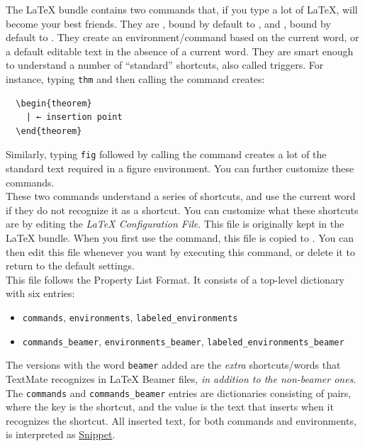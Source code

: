 \documentclass[11pt, x11names]{article}
\begin{document}
The LaTeX bundle contains two commands that, if you type a lot of LaTeX, will become your best friends. They are , bound by default to \keys{\cmd + \textless{}}, and , bound by default to \keys{\cmd + \textgreater{}}. They create an environment/command based on the current word, or a default editable text in the absence of a current word. They are smart enough to understand a number of “standard” shortcuts, also called triggers. For instance, typing \texttt{thm} and then calling the  command creates:

\begin{verbatim}
  \begin{theorem}
    | ← insertion point
  \end{theorem}
\end{verbatim}

Similarly, typing \texttt{fig} followed by calling the  command creates a lot of the standard text required in a figure environment. You can further customize these commands.\\

These two commands understand a series of shortcuts, and use the current word if they do not recognize it as a shortcut. You can customize what these shortcuts are by editing the \emph{LaTeX Configuration File}. This file is originally kept in the LaTeX bundle. When you first use the  command, this file is copied to . You can then edit this file whenever you want by executing this command, or delete it to return to the default settings.\\

This file follows the Property List Format. It consists of a top-level dictionary
with six entries:

\begin{itemize}
  \item \texttt{commands}, \texttt{environments}, \texttt{labeled\_environments}
  \item \texttt{commands\_beamer}, \texttt{environments\_beamer}, \texttt{labeled\_environments\_beamer}
\end{itemize}

\begin{sloppypar}
The versions with the word \texttt{beamer} added are the \emph{extra} shortcuts/words that TextMate recognizes in LaTeX Beamer files, \emph{in addition to the non-beamer ones}. The \texttt{commands} and \texttt{commands\_beamer} entries are dictionaries consisting of pairs, where the key is the shortcut, and the value is the text that  inserts when it recognizes the shortcut. All inserted text, for both commands and environments, is interpreted as \href{http://manual.textmate.org/snippets.html#snippets}{Snippet}.\\
\end{sloppypar}
\end{document}
